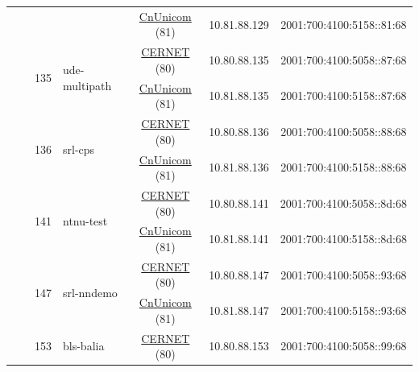 \begin{small}
\begin{center}
\begin{longtable}{|c|c|c|c|c|c|c|c|}
  &  &  &  & \multicolumn{2}{|c|}{\tiny{\href{http://www.chinaunicom.com}{CnUnicom} (81)}} & \tiny{10.81.88.129} & \tiny{2001:700:4100:5158::81:68} \\* \cline{3-3}\cline{4-4}\cline{5-5}\cline{6-6}\cline{7-7}\cline{8-8}
  &  & \multirow{2}{*}{\tiny{135}} & \multicolumn{1}{|l|}{\multirow{2}{*}{\tiny{ude-multipath}}} & \multicolumn{2}{|c|}{\tiny{\href{http://www.cernet.edu.cn}{CERNET} (80)}} & \tiny{10.80.88.135} & \tiny{2001:700:4100:5058::87:68} \\* \cline{5-5}\cline{6-6}\cline{7-7}\cline{8-8}
  &  &  &  & \multicolumn{2}{|c|}{\tiny{\href{http://www.chinaunicom.com}{CnUnicom} (81)}} & \tiny{10.81.88.135} & \tiny{2001:700:4100:5158::87:68} \\* \cline{3-3}\cline{4-4}\cline{5-5}\cline{6-6}\cline{7-7}\cline{8-8}
  &  & \multirow{2}{*}{\tiny{136}} & \multicolumn{1}{|l|}{\multirow{2}{*}{\tiny{srl-cps}}} & \multicolumn{2}{|c|}{\tiny{\href{http://www.cernet.edu.cn}{CERNET} (80)}} & \tiny{10.80.88.136} & \tiny{2001:700:4100:5058::88:68} \\* \cline{5-5}\cline{6-6}\cline{7-7}\cline{8-8}
  &  &  &  & \multicolumn{2}{|c|}{\tiny{\href{http://www.chinaunicom.com}{CnUnicom} (81)}} & \tiny{10.81.88.136} & \tiny{2001:700:4100:5158::88:68} \\* \cline{3-3}\cline{4-4}\cline{5-5}\cline{6-6}\cline{7-7}\cline{8-8}
  &  & \multirow{2}{*}{\tiny{141}} & \multicolumn{1}{|l|}{\multirow{2}{*}{\tiny{ntnu-test}}} & \multicolumn{2}{|c|}{\tiny{\href{http://www.cernet.edu.cn}{CERNET} (80)}} & \tiny{10.80.88.141} & \tiny{2001:700:4100:5058::8d:68} \\* \cline{5-5}\cline{6-6}\cline{7-7}\cline{8-8}
  &  &  &  & \multicolumn{2}{|c|}{\tiny{\href{http://www.chinaunicom.com}{CnUnicom} (81)}} & \tiny{10.81.88.141} & \tiny{2001:700:4100:5158::8d:68} \\* \cline{3-3}\cline{4-4}\cline{5-5}\cline{6-6}\cline{7-7}\cline{8-8}
  &  & \multirow{2}{*}{\tiny{147}} & \multicolumn{1}{|l|}{\multirow{2}{*}{\tiny{srl-nndemo}}} & \multicolumn{2}{|c|}{\tiny{\href{http://www.cernet.edu.cn}{CERNET} (80)}} & \tiny{10.80.88.147} & \tiny{2001:700:4100:5058::93:68} \\* \cline{5-5}\cline{6-6}\cline{7-7}\cline{8-8}
  &  &  &  & \multicolumn{2}{|c|}{\tiny{\href{http://www.chinaunicom.com}{CnUnicom} (81)}} & \tiny{10.81.88.147} & \tiny{2001:700:4100:5158::93:68} \\* \cline{3-3}\cline{4-4}\cline{5-5}\cline{6-6}\cline{7-7}\cline{8-8}
  &  & \multirow{2}{*}{\tiny{153}} & \multicolumn{1}{|l|}{\multirow{2}{*}{\tiny{bls-balia}}} & \multicolumn{2}{|c|}{\tiny{\href{http://www.cernet.edu.cn}{CERNET} (80)}} & \tiny{10.80.88.153} & \tiny{2001:700:4100:5058::99:68} \\* \cline{5-5}\cline{6-6}\cline{7-7}\cline{8-8}

\end{longtable}
\end{center}
\end{small}
